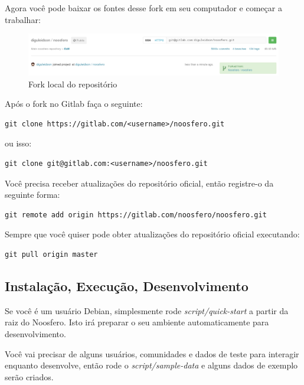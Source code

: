 \documentclass[11pt]{article}
\begin{document}
Agora você pode baixar os fontes desse fork em seu computador e começar a trabalhar: 

\begin{figure}[h]
\center
\includegraphics[scale=0.4]{gitlab-forked.png}
\caption{Fork local do repositório}
\label{fig:gitlab-forked}
\end{figure}

Após o fork no Gitlab faça o seguinte: 

\begin{Verbatim}[frame=single,fontfamily=courier]
  git clone https://gitlab.com/<username>/noosfero.git 
\end{Verbatim}

ou isso: 

\begin{Verbatim}[frame=single,fontfamily=courier]
  git clone git@gitlab.com:<username>/noosfero.git
\end{Verbatim}

Você precisa receber atualizações do repositório oficial, então registre-o
da seguinte forma:

\begin{Verbatim}[frame=single,fontfamily=courier]
  git remote add origin https://gitlab.com/noosfero/noosfero.git
\end{Verbatim}

Sempre que você quiser pode obter atualizações do repositório oficial
executando:

\begin{Verbatim}[frame=single,fontfamily=courier]
  git pull origin master
\end{Verbatim}

\subsection{Instalação, Execução, Desenvolvimento}

Se você é um usuário Debian, simplesmente rode {\it script/quick-start} a partir da
raiz do Noosfero. Isto irá preparar o seu ambiente automaticamente para
desenvolvimento.

Você vai precisar de alguns usuários, comunidades e dados de teste para interagir
enquanto desenvolve, então rode o {\it script/sample-data} e alguns dados de
exemplo serão criados.
\end{document}
